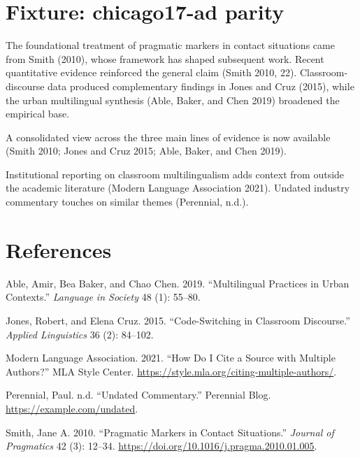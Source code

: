 

\hypertarget{fixture-chicago17-ad-parity}{%
\section{Fixture: chicago17-ad
parity}\label{fixture-chicago17-ad-parity}}

The foundational treatment of pragmatic markers in contact situations
came from Smith (2010), whose framework has shaped subsequent work.
Recent quantitative evidence reinforced the general claim (Smith 2010,
22). Classroom-discourse data produced complementary findings in Jones
and Cruz (2015), while the urban multilingual synthesis (Able, Baker,
and Chen 2019) broadened the empirical base.

A consolidated view across the three main lines of evidence is now
available (Smith 2010; Jones and Cruz 2015; Able, Baker, and Chen 2019).

Institutional reporting on classroom multilingualism adds context from
outside the academic literature (Modern Language Association 2021).
Undated industry commentary touches on similar themes (Perennial, n.d.).

\hypertarget{bibliography}{%
\section*{References}\label{bibliography}}

\hypertarget{refs}{}
\begin{CSLReferences}{1}{0}
\leavevmode{}%
Able, Amir, Bea Baker, and Chao Chen. 2019. {``Multilingual Practices in
Urban Contexts.''} \emph{Language in Society} 48 (1): 55--80.

\leavevmode{}%
Jones, Robert, and Elena Cruz. 2015. {``Code-Switching in Classroom
Discourse.''} \emph{Applied Linguistics} 36 (2): 84--102.

\leavevmode{}%
Modern Language Association. 2021. {``How Do I Cite a Source with
Multiple Authors?''} MLA Style Center.
\url{https://style.mla.org/citing-multiple-authors/}.

\leavevmode{}%
Perennial, Paul. n.d. {``Undated Commentary.''} Perennial Blog.
\url{https://example.com/undated}.

\leavevmode{}%
Smith, Jane A. 2010. {``Pragmatic Markers in Contact Situations.''}
\emph{Journal of Pragmatics} 42 (3): 12--34.
\url{https://doi.org/10.1016/j.pragma.2010.01.005}.

\end{CSLReferences}

